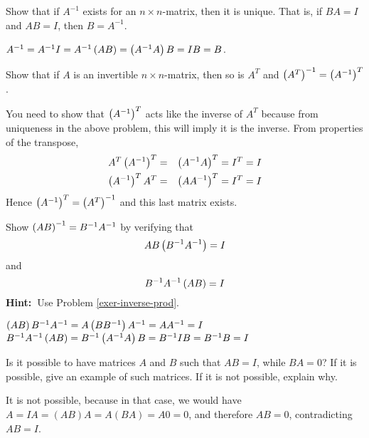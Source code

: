 \begin{enumialphparenastyle}
\begin{ex}\label{exer-inverse-prod}Show that if $A^{-1}$ exists for an $n\times n$-matrix, then it is unique. That is, if $BA=I$ and $AB=I$, then $B=A^{-1}$. 
\begin{sol}
 $A^{-1}=A^{-1}I=A^{-1}\left(AB\right) =\left(A^{-1}A\right) B=IB=B$.
\end{sol}
\end{ex}

\begin{ex}Show that if $A$ is an invertible $n\times n$-matrix, then so is 
$A^{T} $ and $\left(A^{T}\right) ^{-1}=\left(A^{-1}\right) ^{T}$. 
\begin{sol}
 You need to show that $\left(A^{-1}\right) ^{T}$ acts like the inverse of $A^{T}
$ because from uniqueness in the above problem, this will imply it is the
inverse. From properties of the transpose,
\begin{eqnarray*}
A^{T}\left(A^{-1}\right) ^{T} &=&\left(A^{-1}A\right) ^{T}=I^{T}=I \\
\left(A^{-1}\right) ^{T}A^{T} &=&\left(AA^{-1}\right) ^{T}=I^{T}=I
\end{eqnarray*}
Hence $\left(A^{-1}\right) ^{T}=\left(A^{T}\right) ^{-1}$ and this last
matrix exists.
\end{sol}
\end{ex}

\begin{ex}Show $\left(AB\right) ^{-1}=B^{-1}A^{-1}$ by verifying that 
\begin{equation*}
AB\left(
B^{-1}A^{-1}\right) =I
\end{equation*} and 
\begin{equation*}
B^{-1}A^{-1}\left(AB\right) =I
\end{equation*}
\textbf{Hint:\ }Use Problem \ref{exer-inverse-prod}.
\begin{sol}
$\left(AB\right)
B^{-1}A^{-1}=A\left(BB^{-1}\right) A^{-1}=AA^{-1}=I$ $B^{-1}A^{-1}\left(
AB\right) =B^{-1}\left(A^{-1}A\right) B=B^{-1}IB=B^{-1}B=I$
\end{sol}
\end{ex}

\begin{ex}
  Is it possible to have matrices $A$ and $B$ such that $AB=I$, while
  $BA=0$? If it is possible, give an example of such matrices. If it
  is not possible, explain why.
  \begin{sol}
    It is not possible, because in that case, we would have
    $A=IA=(AB)A=A(BA)=A0=0$, and therefore $AB=0$, contradicting $AB=I$.
  \end{sol}
\end{ex}


\end{enumialphparenastyle}
